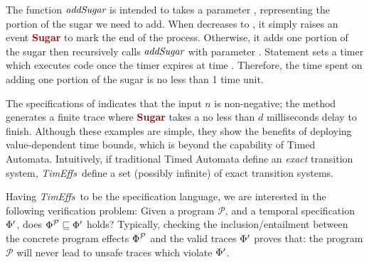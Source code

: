 \documentclass[acmsmall,10pt,review]{acmart}
\newcommand{\timedEffects}{\emph{TimEffs}}
\newcommand{\effect}{\textcolor{black}{\ensuremath{\mathrm{\Phi}}}}
\newcommand{\anyevent}[1]{{\textcolor{darkred}
{{\textbf{\footnotesize #1}}}}}
\newcommand{\code}[1]{{\tt{\ensuremath{\m{#1}}}}}
\newcommand{\CONTAIN}{\sqsubseteq}
\newcommand{\m}{\mathit}
\def\defeq{\ensuremath{\,\triangleq}}
\begin{document}
The function 
\code{\emph{addSugar}} is intended to takes a parameter , representing 
the portion of the sugar we need to add. When  decreases to , 
it simply raises an event \anyevent{Sugar} to mark the end of the process. 
Otherwise, it adds one portion of the sugar then recursively calls \code{\emph{addSugar}} with parameter . 
Statement  sets a timer which executes code  once the timer expires at time . 
Therefore, the time spent on adding one portion of the sugar is no less than 1 time unit. 


The specifications of   indicates that the 
input  \code{n} is non-negative; the method 
generates a finite trace where \anyevent{Sugar} takes a no less 
than \code{d} milliseconds delay to finish. 
Although these examples are simple, they show the benefits of deploying 
value-dependent 
time bounds, which is beyond the capability of Timed Automata. Intuitively, if traditional Timed Automata define an 
\emph{exact} transition system, \timedEffects\ define 
a set (possibly infinite) of exact transition systems. 
 
   

Having \timedEffects\ to be  the specification language, we are interested in the following verification problem: 
Given a program \code{\mathcal{P}},
and a temporal specification \code{\effect^{\prime}}, does 
\code{\effect^{\mathcal{P}} \CONTAIN \effect^{\prime}} holds? Typically, 
checking the inclusion/entailment between the concrete program effects \code{\effect^{\mathcal{P}}} and the valid traces \code{\effect^{\prime}} proves that: the program \code{\mathcal{P}} will never lead to unsafe traces which violate \code{\effect^{\prime}}.
\end{document}
